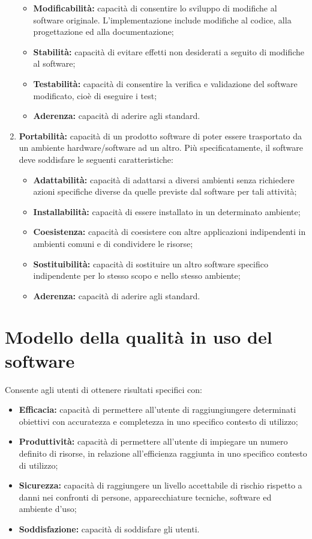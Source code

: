 \begin{enumerate}
\begin{itemize}
 		\item \textbf{Modificabilità:} capacità di consentire lo sviluppo di modifiche al software originale. L’implementazione include modifiche al codice, alla progettazione ed alla documentazione;
 		\item \textbf{Stabilità:} capacità di evitare effetti non desiderati a seguito di modifiche al software;
 		\item \textbf{Testabilità:} capacità di consentire la verifica e validazione del software modificato, cioè di eseguire i test;
 		\item \textbf{Aderenza:} capacità di aderire agli standard.
 	\end{itemize}
	\item \textbf{Portabilità:} capacità di un prodotto software di poter essere trasportato da un ambiente hardware/software ad un altro. Più specificatamente, il software deve soddisfare le seguenti caratteristiche:
	\begin{itemize}
		\item \textbf{Adattabilità:} capacità di adattarsi a diversi ambienti senza richiedere azioni specifiche diverse da quelle previste dal software per tali attività;
		\item \textbf{Installabilità:} capacità di essere installato in un determinato ambiente;
		\item \textbf{Coesistenza:} capacità di coesistere con altre applicazioni indipendenti in ambienti comuni e di condividere le risorse;
		\item \textbf{Sostituibilità:} capacità di sostituire un altro software specifico indipendente per lo stesso scopo e nello stesso ambiente;
		\item \textbf{Aderenza:} capacità di aderire agli standard.
	\end{itemize}
\end{enumerate}

\section{Modello della qualità in uso del software} \label{5.2}
Consente agli utenti di ottenere risultati specifici con:
\begin{itemize}
	\item \textbf{Efficacia:} capacità di permettere all’utente di raggiungiungere determinati obiettivi con accuratezza e completezza in uno specifico contesto di utilizzo;
	\item \textbf{Produttività:} capacità di permettere all’utente di impiegare un numero definito di risorse, in relazione all’efficienza raggiunta in uno specifico contesto di utilizzo;
	\item \textbf{Sicurezza:} capacità di raggiungere un livello accettabile di rischio rispetto a danni nei confronti di persone, apparecchiature tecniche, software ed ambiente d’uso;
	\item \textbf{Soddisfazione:} capacità di soddisfare gli utenti.
\end{itemize}